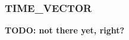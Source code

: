 \documentclass[a4paper,11pt,pdftex,twoside]{scrartcl}
\renewcommand{\bf}{\normalfont \bfseries}
\begin{document}
{{{%
%
%

\subsubsection{TIME\_VECTOR}
\label{subsec_time_vector}

{\bf TODO: not there yet, right?}

%

}}}
\end{document}
